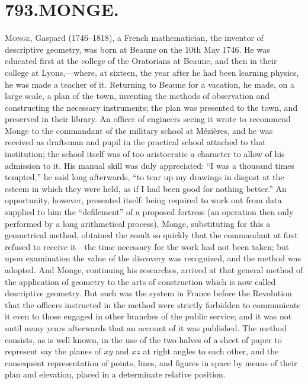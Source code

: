 \documentclass[11pt,a4paper]{article}
\begin{document}
\section*{793.\quad MONGE.}


\smallskip

\textsc{Monge,} Gaspard (1746--1818), a French mathematician, the inventor of descriptive geometry, was born at Beaune on the 10th May 1746. He was educated first at the college of the Oratorians at Beaune, and then in their college at Lyons,---where, at sixteen, the year after he had been learning physics, he was made a teacher of it. Returning to Beaune for a vacation, he made, on a large scale, a plan of the town, inventing the methods of observation and constructing the necessary instruments; the plan was presented to the town, and preserved in their library. An officer of engineers seeing it wrote to recommend Monge to the commandant of the military school at M\'ezi\`eres, and he was received as draftsman and pupil in the practical school attached to that institution; the school itself was of too aristocratic a character to allow of his admission to it. His manual skill was duly appreciated: ``I was a thousand times tempted,'' he said long afterwards, ``to tear up my drawings in disgust at the esteem in which they were held, as if I had been good for nothing better.'' An opportunity, however, presented itself: being required to work out from data supplied to him the ``defilement'' of a proposed fortress (an operation then only performed by a long arithmetical process), Monge, substituting for this a geometrical method, obtained the result so quickly that the commandant at first refused to receive it---the time necessary for the work had not been taken; but upon examination the value of the discovery was recognized, and the method was adopted. And Monge, continuing his researches, arrived at that general method of the application of geometry to the arts of construction which is now called descriptive geometry. But such was the system in France before the Revolution that the officers instructed in the method were strictly forbidden to communicate it even to those engaged in other branches of the public service; and it was not until many years afterwards that an account of it was published. The method consists, as is well known, in the use of the two halves of a sheet of paper to represent say the planes of $xy$ and $xz$ at right angles to each other, and the consequent representation of points, lines, and figures in space by means of their plan and elevation, placed in a determinate relative position.
\end{document}
